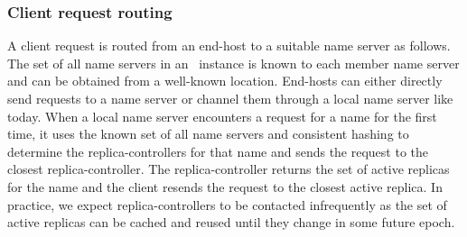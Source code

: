 


%
%
%
%
%



\subsubsection{Client request routing}
\label{sec:routing_client_requests}
A client request is routed from an end-host to a suitable name server as follows.
The set of all name servers in an \auspice\ instance is known to each member name server and can be obtained from a well-known location. 
End-hosts can either directly send requests to a name server or channel them through a local name server like today. 
When a local name server encounters a request for a name for the first time, it uses the known set of all name servers and consistent hashing to determine the replica-controllers for that name and sends the request to the closest replica-controller. The replica-controller returns the set of active replicas for the name and the client resends the request to the closest active replica.  In practice, we expect replica-controllers to be contacted infrequently as the set of active replicas can be cached and reused until they change in some future epoch. %







